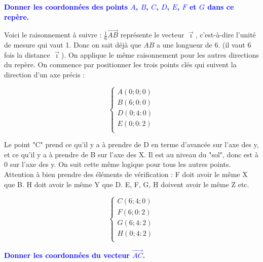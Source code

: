 \documentclass{exam}
\begin{document}
\begin{questions}
    \question[2] \textbf{\textcolor{blue}{Donner les coordonnées des points $A$, $B$, $C$, $D$, $E$, $F$ et $G$ dans ce repère.}}

    Voici le raisonnement à suivre : $\frac{1}{6} \overrightarrow{AB}\mathpunct{}$ représente le vecteur $\vec{\imath}$, c'est-à-dire l'unité de mesure qui vaut 1. Donc on sait déjà que $AB$ a une longueur de 6. (il vaut 6 fois la distance $\vec{\imath}$). On applique le même raisonnement pour les autres directions du repère. On commence par positionner les trois points clés qui suivent la direction d'un axe précis :

    \[
      \left\{
      \begin{array}{l}
          A(0 ; 0 ; 0) \\
          B(6 ; 0 : 0) \\
          D(0 ; 4 : 0) \\
          E(0 ; 0 : 2) \\
      \end{array}
      \right.
      \]

    Le point "C" prend ce qu'il y a à prendre de D en terme d'avancée sur l'axe des y, et ce qu'il y a à prendre de B sur l'axe des X. Il est au niveau du "sol", donc est à 0 sur l'axe des y. On suit cette même logique pour tous les autres points. Attention à bien prendre des éléments de vérification : F doit avoir le même X que B. H doit avoir le même Y que D. E, F, G, H doivent avoir le même Z etc. 

        \[
      \left\{
      \begin{array}{l}
          C(6 ; 4 ; 0) \\
          F(6 ; 0 : 2) \\
          G(6 ; 4 : 2) \\
          H(0 ; 4 : 2) \\
      \end{array}
      \right.
      \]

    \question[0.5] \textbf{\textcolor{blue}{Donner les coordonnées du vecteur $\overrightarrow{AC}$.}}


\end{questions}
\end{document}
